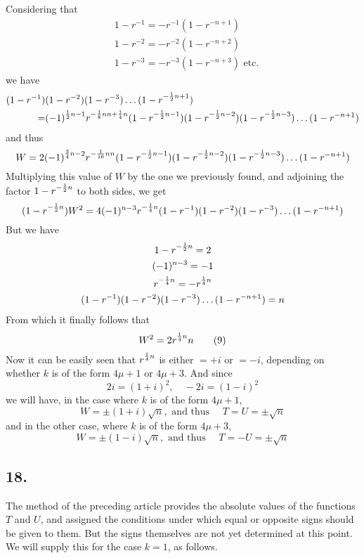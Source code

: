 \documentclass[twoside,12pt]{memoir}
\let\oldfrac\frac
\def\frac#1#2{\mathchoice{\tfrac{#1}{#2}}{\oldfrac{#1}{#2}}{\genfrac{}{}{}{2}{#1}{#2\mathstrut}}{\genfrac{}{}{}{3}{#1}{#2\mathstrut}}}
\begin{document}
Considering that
\[\begin{aligned}
& 1-r^{-1}=-r^{-1}(1-r^{-n+1}) \\
& 1-r^{-2}=-r^{-2}(1-r^{-n+2}) \\
& 1-r^{-3}=-r^{-3}(1-r^{-n+3}) \text{ etc{.}}
\end{aligned}\]
we have
\[\begin{aligned}
 (1-r^{-1})&(1-r^{-2})(1-r^{-3}) \ldots(1-r^{-\frac{1}{2} n+1}) \\
=&(-1)^{\frac{1}{2} n-1} r^{-\frac{1}{8} n n+\frac{1}{4} n}(1-r^{-\frac{1}{2} n-1})(1-r^{-\frac{1}{2} n-2})(1-r^{-\frac{1}{2} n-3}) \ldots(1-r^{-n+1})
\end{aligned}\]
and thus
\[W=2(-1)^{\frac{3}{4} n-2} r^{-\frac{1}{16} n n}(1-r^{-\frac{1}{2} n-1})(1-r^{-\frac{1}{2} n-2})(1-r^{-\frac{1}{2} n-3}) \ldots(1-r^{-n+1})\]
Multiplying this value of \(W\) by the one we previously found, and adjoining the factor \(1-r^{-\frac{1}{2} n}\) to both sides, we get
\[(1-r^{-\frac{1}{2} n}) W^{2}=4(-1)^{n-3} r^{-\frac{1}{4} n}(1-r^{-1})(1-r^{-2})(1-r^{-3}) \ldots(1-r^{-n+1})\]
But we have
\[\begin{gathered}
1-r^{-\frac{1}{2} n}=2 \\
(-1)^{n-3}=-1 \\
r^{-\frac{1}{4} n}=-r^{\frac{1}{4} n} \\
(1-r^{-1})(1-r^{-2})(1-r^{-3}) \ldots(1-r^{-n+1})=n
\end{gathered}\]
From which it finally follows that\pagebreak%
\[ W^{2}=2 r^{\frac{1}{4} n} n \tag{9}\]
Now it can be easily seen that \(r^{\frac{1}{4} n}\) is either \(=+i\) or \(=-i\), depending on whether \(k\) is of the form \(4 \mu+1\) or \(4 \mu+3\). And since
\[2 i=(1+i)^{2}, \quad-2 i=(1-i)^{2}\]
we will have, in the case where \(k\) is of the form \(4 \mu+1\),
\[W= \pm(1+i) \sqrt{n}, \text{ and thus } \quad T=U= \pm \sqrt{n}\]
and in the other case, where \(k\) is of the form \(4 \mu+3\),
\[W= \pm(1-i) \sqrt{n}, \text{ and thus } \quad T=-U= \pm \sqrt{n}\]

\subsection*{18.}
 
The method of the preceding article provides the absolute values of the functions \(T\) and \(U\), and assigned the conditions under which equal or opposite signs should be given to them.  But the signs themselves are not yet determined at this point. We will supply this for the case \(k=1\), as follows.
 
\end{document}
